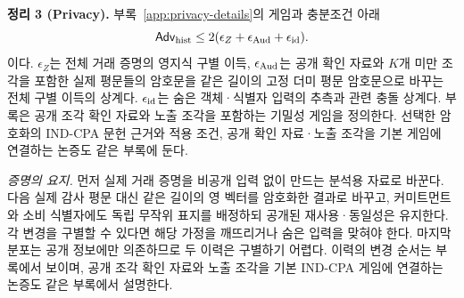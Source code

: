 \textbf{정리 3 (Privacy).}
부록~\ref{app:privacy-details}의 게임과 충분조건 아래
\begin{equation}
 \mathsf{Adv}_{\rm hist}\leq
 2(\epsilon_Z+\epsilon_{\rm Aud}+\epsilon_{\rm id}).
 \label{eq:privacy-bound}
\end{equation}
이다. $\epsilon_Z$는 전체 거래 증명의 영지식 구별 이득,
$\epsilon_{\rm Aud}$는 공개 확인 자료와 $K$개 미만 조각을 포함한
실제 평문들의 암호문을 같은 길이의 고정 더미 평문 암호문으로 바꾸는
전체 구별 이득의 상계다. $\epsilon_{\rm id}$는 숨은 객체·식별자
입력의 추측과 관련 충돌 상계다.
부록은 공개 조각 확인 자료와 노출 조각을 포함하는 기밀성 게임을 정의한다.
선택한 암호화의 IND-CPA 문헌 근거와 적용 조건,
공개 확인 자료·노출 조각을 기본 게임에 연결하는 논증도 같은 부록에 둔다.

\emph{증명의 요지.}
먼저 실제 거래 증명을 비공개 입력 없이 만드는 분석용 자료로 바꾼다.
다음 실제 감사 평문 대신 같은 길이의 영 벡터를 암호화한 결과로 바꾸고,
커미트먼트와 소비 식별자에도 독립 무작위 표지를 배정하되
공개된 재사용·동일성은 유지한다. 각 변경을 구별할 수 있다면
해당 가정을 깨뜨리거나 숨은 입력을 맞혀야 한다.
마지막 분포는 공개 정보에만 의존하므로 두 이력은 구별하기 어렵다.
이력의 변경 순서는 부록에서 보이며, 공개 조각 확인 자료와 노출 조각을
기본 IND-CPA 게임에 연결하는 논증도 같은 부록에서 설명한다.
